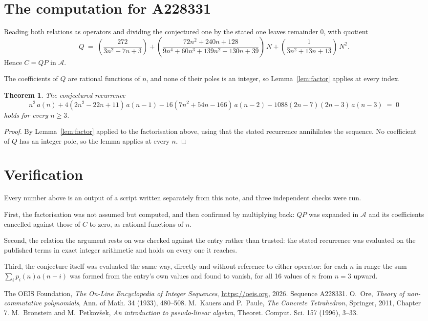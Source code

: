 \documentclass[11pt,a4paper]{article}
\theoremstyle{plain}
\newtheorem{theorem}{Theorem}
\theoremstyle{definition}
\begin{document}
\section{The computation for A228331}

Reading both relations as operators and dividing the conjectured one by the stated one
leaves remainder $0$, with quotient
\[
Q \;=\; \left(\frac{272}{3 n^{2} + 7 n + 3}\right) + \left(\frac{72 n^{2} + 240 n + 128}{9 n^{4} + 60 n^{3} + 139 n^{2} + 130 n + 39}\right)\,N + \left(\frac{1}{3 n^{2} + 13 n + 13}\right)\,N^{2} .
\]
Hence $C=QP$ in $\mathcal{A}$.

The coefficients of $Q$ are rational functions of $n$, and none of their poles is an integer, so Lemma~\ref{lem:factor} applies at every index.

\begin{theorem}
The conjectured recurrence
\[
n^{2}\,a(n) + 4 \left(2 n^{2} - 22 n + 11\right)\,a(n-1) -  16 \left(7 n^{2} + 54 n - 166\right)\,a(n-2) -  1088 \left(2 n - 7\right) \left(2 n - 3\right)\,a(n-3) \;=\;0
\]
holds for every $n\ge3$.
\end{theorem}

\begin{proof}
By Lemma~\ref{lem:factor} applied to the factorisation above, using that the stated
recurrence annihilates the sequence. No coefficient of $Q$ has an integer pole, so the lemma applies at every $n$.
\end{proof}

\section{Verification}

Every number above is an output of a script written separately from this note, and three
independent checks were run.

First, the factorisation was not assumed but computed, and then confirmed by multiplying
back: $QP$ was expanded in $\mathcal{A}$ and its coefficients cancelled against those of
$C$ to zero, as rational functions of $n$.

Second, the relation the argument rests on was checked against the entry rather than
trusted: the stated recurrence was evaluated on the published terms in exact integer
arithmetic and holds on every one it reaches.

Third, the conjecture itself was evaluated the same way, directly and without reference to
either operator: for each $n$ in range the sum $\sum_{i}p_{i}(n)a(n-i)$ was formed from the
entry's own values and found to vanish, for all 16 values of $n$ from
$n=3$ upward.

\begin{thebibliography}{9}
 The OEIS Foundation, \emph{The On-Line Encyclopedia of Integer Sequences},
\url{https://oeis.org}, 2026. Sequence A228331.
 O.~Ore, \emph{Theory of non-commutative polynomials}, Ann. of Math. 34
(1933), 480--508.
 M.~Kauers and P.~Paule, \emph{The Concrete Tetrahedron}, Springer, 2011,
Chapter 7.
 M.~Bronstein and M.~Petkov\v{s}ek, \emph{An introduction to
pseudo-linear algebra}, Theoret. Comput. Sci. 157 (1996), 3--33.
\end{thebibliography}
\end{document}
